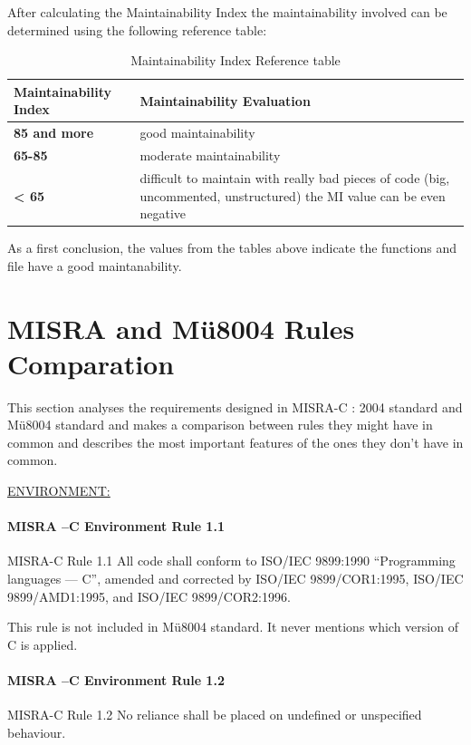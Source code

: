 After calculating the Maintainability Index the maintainability involved can be determined using the following reference table:

{\footnotesize\sffamily\centering
  \begin{longtable}{||p{}|p{}||}
  \caption{Maintainability Index Reference table}\\
    \hline\hline
    \textbf{Maintainability Index} & \textbf{Maintainability Evaluation} \\
    \hline\hline
    \endhead
    \hline\hline
    \endfoot
    \textbf{85 and more}
& good maintainability
    \\
    \hline
    \textbf{65-85}
& moderate maintainability
    \\
    \hline
    \textbf{< 65}
& difficult to maintain
with really bad pieces of code (big, uncommented, unstructured) the MI value can be even negative
    \\
    \hline
\end{longtable}}

As a first conclusion, the values from the tables above indicate the functions and file have a good maintanability.

\section{MISRA and Mü8004 Rules Comparation}
This section analyses the requirements designed in MISRA-C : 2004 standard and Mü8004 standard and makes a comparison between rules they might have in common and describes the most important features of the ones they don’t have in common. 

\begin{center}
\textsc{\underline{ENVIRONMENT:}}
\end{center}

\paragraph{MISRA –C Environment Rule 1.1}
MISRA-C Rule 1.1 All code shall conform to ISO/IEC 9899:1990
“Programming languages — C”, amended and corrected by
ISO/IEC 9899/COR1:1995, ISO/IEC 9899/AMD1:1995, and
ISO/IEC 9899/COR2:1996.

This rule is not included in Mü8004 standard. It never mentions which version of C is applied.

\paragraph{MISRA –C Environment Rule 1.2}
MISRA-C Rule 1.2 No reliance shall be placed on undefined or unspecified
behaviour.

